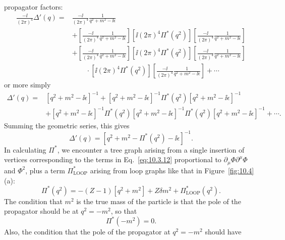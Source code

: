 

propagator factors:
\begin{equation}
\begin{split}
\frac{-\ii}{(2\pi)^4}\Delta'(q)={}&
\frac{-\ii}{(2\pi)^4}\frac{1}{q^2+m^2-\ii\epsilon}
\\
&+\left[\frac{-\ii}{(2\pi)^4}\frac{1}{q^2+m^2-\ii\epsilon}\right]
[\ii(2\pi)^4\Pi^*(q^2)]
\left[\frac{-\ii}{(2\pi)^4}\frac{1}{q^2+m^2-\ii\epsilon}\right]
\\
&+\left[\frac{-\ii}{(2\pi)^4}\frac{1}{q^2+m^2-\ii\epsilon}\right]
[\ii(2\pi)^4\Pi^*(q^2)]
\left[\frac{-\ii}{(2\pi)^4}\frac{1}{q^2+m^2-\ii\epsilon}\right]
\\
&\qquad\cdot[\ii(2\pi)^4\Pi^*(q^2)]
\left[\frac{-\ii}{(2\pi)^4}\frac{1}{q^2+m^2-\ii\epsilon}\right]+\cdots
\end{split}
\tag{10.3.13}\label{eq:10.3.13}
\end{equation}
or more simply
\begin{equation}
\begin{split}
\Delta'(q)={}&[q^2+m^2-\ii\epsilon]^{-1}
+[q^2+m^2-\ii\epsilon]^{-1}\Pi^*(q^2)[q^2+m^2-\ii\epsilon]^{-1}
\\
&+[q^2+m^2-\ii\epsilon]^{-1}\Pi^*(q^2)[q^2+m^2-\ii\epsilon]^{-1}
\Pi^*(q^2)[q^2+m^2-\ii\epsilon]^{-1}+\cdots.
\end{split}
\tag{10.3.14}\label{eq:10.3.14}
\end{equation}
Summing the geometric series, this gives
\begin{equation}
\Delta'(q)=[q^2+m^2-\Pi^*(q^2)-\ii\epsilon]^{-1}.
\tag{10.3.15}\label{eq:10.3.15}
\end{equation}
In calculating $\Pi^*$, we encounter a tree graph arising from a single
insertion of vertices corresponding to the terms in Eq.~\eqref{eq:10.3.12}
proportional to $\partial_\mu\Phi\partial^\mu\Phi$ and $\Phi^2$, plus a term
$\Pi^*_{\mathrm{LOOP}}$ arising from loop graphs like that in
Figure~\ref{fig:10.4}(a):
\begin{equation}
\Pi^*(q^2)=-(Z-1)[q^2+m^2]+Z\delta m^2+\Pi^*_{\mathrm{LOOP}}(q^2).
\tag{10.3.16}\label{eq:10.3.16}
\end{equation}
The condition that $m^2$ is the true mass of the particle is that the pole of
the propagator should be at $q^2=-m^2$, so that
\begin{equation}
\Pi^*(-m^2)=0.
\tag{10.3.17}\label{eq:10.3.17}
\end{equation}
Also, the condition that the pole of the propagator at $q^2=-m^2$ should have

